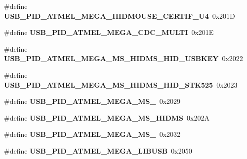 \begin{DoxyCompactItemize}
\item 
\hypertarget{group__usb__atmel__ids__group_ga3b4af600b6b2b5afc7ca55a6686d9bea}{\#define {\bfseries U\-S\-B\-\_\-\-P\-I\-D\-\_\-\-A\-T\-M\-E\-L\-\_\-\-M\-E\-G\-A\-\_\-\-H\-I\-D\-M\-O\-U\-S\-E\-\_\-\-C\-E\-R\-T\-I\-F\-\_\-\-U4}~0x201\-D}\label{group__usb__atmel__ids__group_ga3b4af600b6b2b5afc7ca55a6686d9bea}

\item 
\hypertarget{group__usb__atmel__ids__group_ga2a5eaaf1184fd8295e0fa4c95d0d2be2}{\#define {\bfseries U\-S\-B\-\_\-\-P\-I\-D\-\_\-\-A\-T\-M\-E\-L\-\_\-\-M\-E\-G\-A\-\_\-\-C\-D\-C\-\_\-\-M\-U\-L\-T\-I}~0x201\-E}\label{group__usb__atmel__ids__group_ga2a5eaaf1184fd8295e0fa4c95d0d2be2}

\item 
\hypertarget{group__usb__atmel__ids__group_ga79aa6a09475a9fbcbb30416b7752349e}{\#define {\bfseries U\-S\-B\-\_\-\-P\-I\-D\-\_\-\-A\-T\-M\-E\-L\-\_\-\-M\-E\-G\-A\-\_\-\-M\-S\-\_\-\-H\-I\-D\-M\-S\-\_\-\-H\-I\-D\-\_\-\-U\-S\-B\-K\-E\-Y}~0x2022}\label{group__usb__atmel__ids__group_ga79aa6a09475a9fbcbb30416b7752349e}

\item 
\hypertarget{group__usb__atmel__ids__group_ga56d6948e6453977046c3fb85e0ff8f48}{\#define {\bfseries U\-S\-B\-\_\-\-P\-I\-D\-\_\-\-A\-T\-M\-E\-L\-\_\-\-M\-E\-G\-A\-\_\-\-M\-S\-\_\-\-H\-I\-D\-M\-S\-\_\-\-H\-I\-D\-\_\-\-S\-T\-K525}~0x2023}\label{group__usb__atmel__ids__group_ga56d6948e6453977046c3fb85e0ff8f48}

\item 
\hypertarget{group__usb__atmel__ids__group_gab485e4b690d9238e96d1b7bb76e76237}{\#define {\bfseries U\-S\-B\-\_\-\-P\-I\-D\-\_\-\-A\-T\-M\-E\-L\-\_\-\-M\-E\-G\-A\-\_\-\-M\-S\-\_}~0x2029}\label{group__usb__atmel__ids__group_gab485e4b690d9238e96d1b7bb76e76237}

\item 
\hypertarget{group__usb__atmel__ids__group_ga9212dd62110d78c0ba313dbc93178de6}{\#define {\bfseries U\-S\-B\-\_\-\-P\-I\-D\-\_\-\-A\-T\-M\-E\-L\-\_\-\-M\-E\-G\-A\-\_\-\-M\-S\-\_\-\-H\-I\-D\-M\-S}~0x202\-A}\label{group__usb__atmel__ids__group_ga9212dd62110d78c0ba313dbc93178de6}

\item 
\hypertarget{group__usb__atmel__ids__group_ga7c7d2af4b6241c33e3addd3573e4d542}{\#define {\bfseries U\-S\-B\-\_\-\-P\-I\-D\-\_\-\-A\-T\-M\-E\-L\-\_\-\-M\-E\-G\-A\-\_\-\-M\-S\-\_}~0x2032}\label{group__usb__atmel__ids__group_ga7c7d2af4b6241c33e3addd3573e4d542}

\item 
\hypertarget{group__usb__atmel__ids__group_ga5dd1ecf3da98d83961de2f5de443e1c5}{\#define {\bfseries U\-S\-B\-\_\-\-P\-I\-D\-\_\-\-A\-T\-M\-E\-L\-\_\-\-M\-E\-G\-A\-\_\-\-L\-I\-B\-U\-S\-B}~0x2050}\label{group__usb__atmel__ids__group_ga5dd1ecf3da98d83961de2f5de443e1c5}

\end{DoxyCompactItemize}
